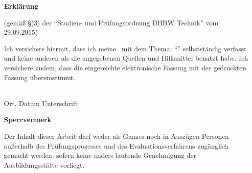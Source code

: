 \cleardoublepage
\thispagestyle{empty}

\begin{framed}
	\begin{center}
		\textsf{\huge{\textbf{Erklärung}}}
	\end{center}
	\medskip
	\noindent	
	
	(gemäß §(3) der \enquote{Studien- und Prüfungsordnung DHBW Technik} vom 29.09.2015)
	
	\smallskip
	
	Ich versichere hiermit, dass ich meine \typeofwork~mit dem Thema: \enquote{\titleofwork} selbstständig verfasst und keine anderen als die angegebenen Quellen und Hilfsmittel benutzt habe. Ich versichere zudem, dass die eingereichte elektronische Fassung mit der gedruckten Fassung übereinstimmt.		
	
	\vspace{1.5cm}
	\noindent
	\underline{\hspace{6cm}}
	\hfill
	\underline{\hspace{6cm}}\\Ort, Datum
	\hfill Unterschrift\hspace{4cm}
\end{framed}

\vfill

\begin{framed}
	\begin{center}
		\textsf{\huge{\textbf{Sperrvermerk}}}
	\end{center}
	\medskip
	\noindent
	
	Der Inhalt dieser Arbeit darf weder als Ganzes noch in Auszügen Personen außerhalb des Prüfungsprozesses und des Evaluationsverfahrens zugänglich gemacht werden, sofern keine anders lautende Genehmigung der Ausbildungsstätte vorliegt.
\end{framed}
